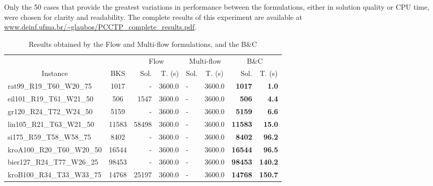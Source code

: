 \documentclass{singlecol-new}
\theoremstyle{TH}{
\newtheorem{lemma}{Lemma}
\newtheorem{theorem}[lemma]{Theorem}
\newtheorem{corrolary}[lemma]{Corrolary}
\newtheorem{conjecture}[lemma]{Conjecture}
\newtheorem{proposition}[lemma]{Proposition}
\newtheorem{claim}[lemma]{Claim}
\newtheorem{stheorem}[lemma]{Wrong Theorem}
}
\theoremstyle{THrm}{
\newtheorem{definition}{Definition}[section]
\newtheorem{question}{Question}[section]
\newtheorem{remark}{Remark}
\newtheorem{scheme}{Scheme}
}
\theoremstyle{THhit}{
\newtheorem{case}{Case}[section]
}
\begin{document}
Only the 50 cases that provide the greatest variations in performance between the formulations, either in solution quality or CPU time, were chosen for clarity and readability. The complete results of this experiment are available at \url{www.deinf.ufma.br/~glaubos/PCCTP_complete_results.pdf}.



\begin{table}
	\centering
	\caption{Results obtained by the Flow and Multi-flow formulations, and the B\&C}
	\label{tab:models}
	{\footnotesize
	\begin{tabular}{lcrrrrrr}
		\hline
		& \multicolumn{1}{l}{} & \multicolumn{2}{c}{Flow \citep{lyra2004problema}} & \multicolumn{2}{c}{Multi-flow \citep{silva2009problema}}          & \multicolumn{2}{c}{B\&C}         \\
		\cline{2-8}
		\multicolumn{1}{c}{Instance} & BKS & Sol. & T. (s) & \multicolumn{1}{c}{Sol.} & \multicolumn{1}{c}{T. (s)} & Sol. & \multicolumn{1}{c}{T. (s)} \\
		\hline
		rat99\_R19\_T60\_W20\_75    & 1017                 & -               & 3600.0 & \multicolumn{1}{l}{-} & 3600.0          & \textbf{1017}  & \textbf{1.0}    \\
		eil101\_R19\_T61\_W21\_50   & 506                  & 1547            & 3600.0 & \multicolumn{1}{l}{-} & 3600.0          & \textbf{506}   & \textbf{4.4}    \\
		gr120\_R24\_T72\_W24\_50    & 5159                 & -               & 3600.0 & \multicolumn{1}{l}{-} & 3600.0          & \textbf{5159}  & \textbf{6.6}    \\
		lin105\_R21\_T63\_W21\_50   & 11583                & 58498           & 3600.0 & \multicolumn{1}{l}{-} & 3600.0          & \textbf{11583} & \textbf{15.0}   \\
		si175\_R59\_T58\_W58\_75    & 8402                 & -               & 3600.0 & \multicolumn{1}{l}{-} & 3600.0          & \textbf{8402}  & \textbf{96.2}   \\
		kroA100\_R20\_T60\_W20\_50  & 16544                & -               & 3600.0 & \multicolumn{1}{l}{-} & 3600.0          & \textbf{16544} & \textbf{96.5}   \\
		bier127\_R24\_T77\_W26\_25  & 98453                & -               & 3600.0 & \multicolumn{1}{l}{-} & 3600.0          & \textbf{98453} & \textbf{140.2}  \\
		kroB100\_R34\_T33\_W33\_75  & 14768                & 25197           & 3600.0 & \multicolumn{1}{l}{-} & 3600.0          & \textbf{14768} & \textbf{150.7}  \\

\end{tabular}}
\end{table}
\end{document}
